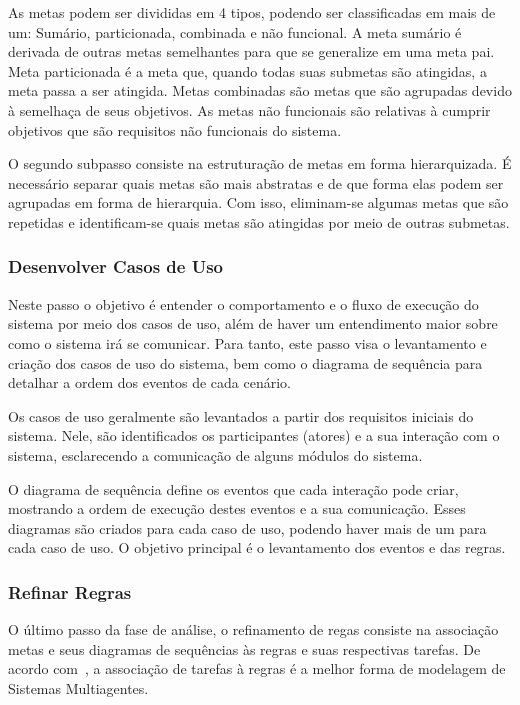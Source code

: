 As metas podem ser divididas em 4 tipos, podendo ser classificadas em mais de um: Sumário, particionada, combinada e não funcional. A meta sumário é derivada de outras metas semelhantes para que se generalize em uma meta pai. Meta particionada é a meta que, quando todas suas submetas são atingidas,  a meta passa a ser atingida. Metas combinadas são metas que são agrupadas devido à semelhaça de seus objetivos. As metas não funcionais são relativas à cumprir objetivos que são requisitos não funcionais do sistema.

O segundo subpasso consiste na estruturação de metas em forma hierarquizada. É necessário separar quais metas são mais abstratas e de que forma elas podem ser agrupadas em forma de hierarquia. Com isso, eliminam-se algumas metas que são repetidas e identificam-se quais metas são atingidas por meio de outras submetas.

\subsubsection{Desenvolver Casos de Uso}

Neste passo o objetivo é entender o comportamento e o fluxo de execução do sistema por meio dos casos de uso, além de haver um entendimento maior sobre como o sistema irá se comunicar. Para tanto, este passo visa o levantamento e criação dos casos de uso do sistema, bem como o diagrama de sequência para detalhar a ordem dos eventos de cada cenário.

Os casos de uso geralmente são levantados a partir dos requisitos iniciais do sistema. Nele, são identificados os participantes (atores) e a sua interação com o sistema, esclarecendo a comunicação de alguns módulos do sistema.

O diagrama de sequência define os eventos que cada interação pode criar, mostrando a ordem de execução destes eventos e a sua comunicação. Esses diagramas são criados para cada caso de uso, podendo haver mais de um para cada caso de uso. O objetivo principal é o levantamento dos eventos e das regras.

\subsubsection{Refinar Regras}

O último passo da fase de análise, o refinamento de regas consiste na associação metas e seus diagramas de sequências às regras e suas respectivas tarefas. De acordo com~\cite{scott01}, a associação de tarefas à regras é a melhor forma de modelagem de Sistemas Multiagentes. 

